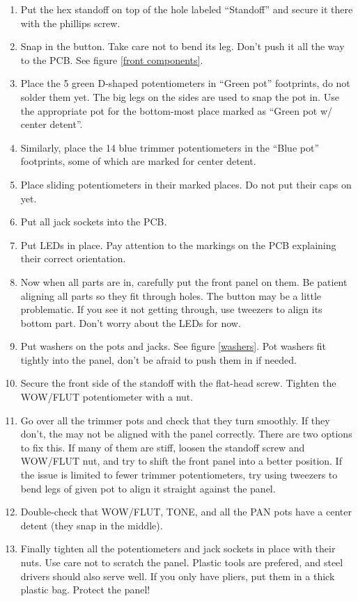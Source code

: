 \documentclass[10pt,a4paper,twocolumn]{article}
\begin{document}
\begin{enumerate}
  \item Put the hex standoff on top of the hole labeled ``Standoff'' and secure
    it there with the phillips screw.
  \item Snap in the button. Take care not to bend its leg. Don't push it all the
    way to the PCB. See figure \ref{front components}.
  \item Place the 5 green D-shaped potentiometers in ``Green pot''
    footprints, do not solder them yet. The big legs on the sides are used to
    snap the pot in. Use the appropriate pot for the bottom-most place
    marked as ``Green pot w/ center detent''.
  \item Similarly, place the 14 blue trimmer potentiometers in the ``Blue pot''
    footprints, some of which are marked for center detent.
  \item Place sliding potentiometers in their marked places. Do not put their
    caps on yet.
  \item Put all jack sockets into the PCB.
  \item Put LEDs in place. Pay attention to the markings on the PCB explaining
    their correct orientation.
  \item Now when all parts are in, carefully put the front panel on them.
    Be patient aligning all parts so they fit through holes. The button may be a
    little problematic. If you see it not getting through, use tweezers to align
    its bottom part. Don't worry about the LEDs for now.
  \item Put washers on the pots and jacks. See figure \ref{washers}. Pot washers
    fit tightly into the panel, don't be afraid to push them in if needed.
  \item Secure the front side of the standoff with the flat-head screw.
    Tighten the WOW/FLUT potentiometer with a nut.
  \item Go over all the trimmer pots and check that they turn smoothly. If they
    don't, the may not be aligned with the panel correctly. There are two
    options to fix this. If many of them are stiff, loosen the standoff screw
    and WOW/FLUT nut, and try to shift the front panel into a better position.
    If the issue is limited to fewer trimmer potentiometers, try using tweezers
    to bend legs of given pot to align it straight against the panel.
  \item Double-check that WOW/FLUT, TONE, and all the PAN pots have a center
    detent (they snap in the middle).
  \item Finally tighten all the potentiometers and jack sockets in place with
    their nuts. Use care not to scratch the panel. Plastic tools are prefered,
    and steel drivers should also serve well. If you only have pliers, put them
    in a thick plastic bag. Protect the panel!
\end{enumerate}
\end{document}
